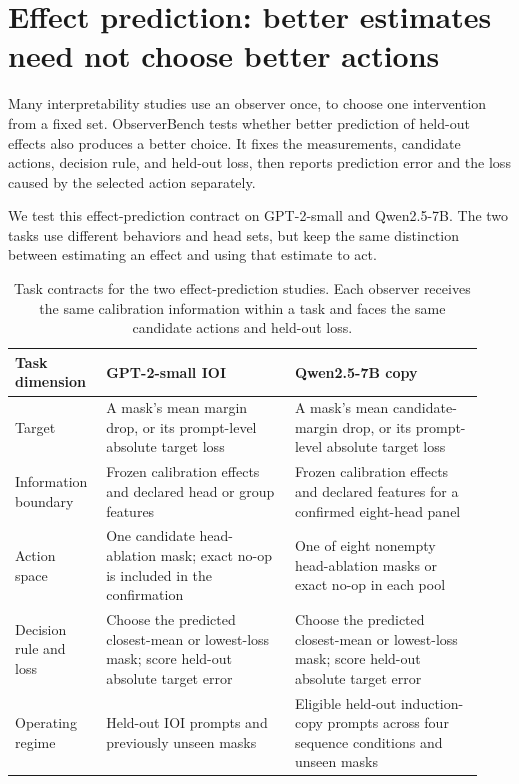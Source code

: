 \section{Effect prediction: better estimates need not choose better actions}
\label{sec:effect-prediction}

Many interpretability studies use an observer once, to choose one intervention
from a fixed set. ObserverBench tests whether better prediction of held-out
effects also produces a better choice. It fixes the measurements, candidate
actions, decision rule, and held-out loss, then reports prediction error and
the loss caused by the selected action separately.

We test this effect-prediction contract on GPT-2-small and Qwen2.5-7B. The two
tasks use different behaviors and head sets, but keep the same distinction
between estimating an effect and using that estimate to act.

\begin{table}[H]
\centering
\scriptsize
\setlength{\tabcolsep}{3.5pt}
\begin{tabular}{@{}L{0.17\linewidth}L{0.38\linewidth}L{0.38\linewidth}@{}}
\toprule
Task dimension & GPT-2-small IOI & Qwen2.5-7B copy \\
\midrule
Target & A mask's mean margin drop, or its prompt-level absolute target loss
& A mask's mean candidate-margin drop, or its prompt-level absolute target
loss \\
Information boundary & Frozen calibration effects and declared head or group
features & Frozen calibration effects and declared features for a confirmed
eight-head panel \\
Action space & One candidate head-ablation mask; exact no-op is included in
the confirmation & One of eight nonempty head-ablation masks or exact no-op in
each pool \\
Decision rule and loss & Choose the predicted closest-mean or lowest-loss
mask; score held-out absolute target error & Choose the predicted closest-mean
or lowest-loss mask; score held-out absolute target error \\
Operating regime & Held-out IOI prompts and previously unseen masks & Eligible
held-out induction-copy prompts across four sequence conditions and unseen
masks \\
\bottomrule
\end{tabular}
\caption{Task contracts for the two effect-prediction studies. Each observer
receives the same calibration information within a task and faces the same
candidate actions and held-out loss.}
\label{tab:effect-prediction-contracts}
\end{table}



